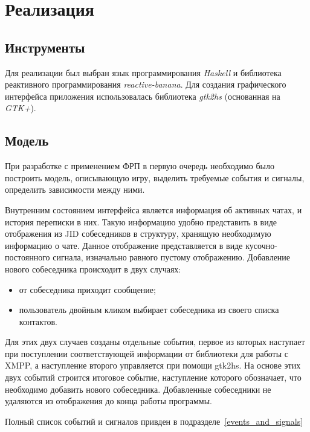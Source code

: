 \section{Реализация}
\subsection{Инструменты}
Для реализации был выбран язык программирования \emph{Haskell} и библиотека реактивного программирования \emph{reactive-banana}.
Для создания графического интерфейса приложения использовалась библиотека \emph{gtk2hs} (основанная на \emph{GTK+}).

\subsection{Модель}
При разработке с применением ФРП в первую очередь необходимо было построить модель, описывающую
игру, выделить требуемые события и сигналы, определить зависимости между ними.

Внутренним состоянием интерфейса является информация об активных чатах, и история переписки в них.
Такую информацию удобно представить в виде отображения из JID собеседников в структуру, хранящую необходимую информацию о чате.
Данное отображение представляется в виде кусочно-постоянного сигнала, изначально равного пустому отображению.
Добавление нового собеседника происходит в двух случаях:
\begin{itemize}
    \item от собеседника приходит сообщение;
    \item пользователь двойным кликом выбирает собеседника из своего списка контактов.
\end{itemize}
Для этих двух случаев созданы отдельные события,
первое из которых наступает при поступлении соответствующей информации от библиотеки для работы с XMPP,
а наступление второго управляется при помощи gtk2hs.
На основе этих двух событий строится итоговое событие, наступление которого обозначает, что необходимо добавить нового собеседника.
Добавленные собеседники не удаляются из отображения до конца работы программы.

Полный список событий и сигналов привден в подразделе~\ref{events_and_signals}

